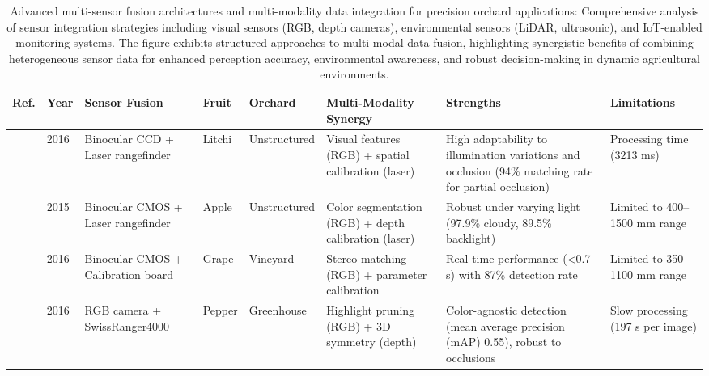 \documentclass{ieeeaccess}
\begin{document}
\iffalse
\begin{table}[ht]
\small
\centering
\caption{Advanced multi-sensor fusion architectures and multi-modality data integration for precision orchard applications: Comprehensive analysis of sensor integration strategies including visual sensors (RGB, depth cameras), environmental sensors (LiDAR, ultrasonic), and IoT-enabled monitoring systems. The figure exhibits structured approaches to multi-modal data fusion, highlighting synergistic benefits of combining heterogeneous sensor data for enhanced perception accuracy, environmental awareness, and robust decision-making in dynamic agricultural environments.} 
\label{tab:dataset}
\begin{tabular}{p{}p{}p{}p{}p{}p{}p{}p{}}
\hline
\textbf{Ref.} & \textbf{Year} & \textbf{Sensor Fusion} & \textbf{Fruit} & \textbf{Orchard} & \textbf{Multi-Modality Synergy} & \textbf{Strengths} & \textbf{Limitations} \\ 
\hline
\cite{wang2016localisation} & 2016 & Binocular CCD + Laser rangefinder & Litchi & Unstructured & Visual features (RGB) + spatial calibration (laser) & High adaptability to illumination variations and occlusion (94\% matching rate for partial occlusion) & Processing time (3213 ms) \\ 
\hline
\cite{si2015location} & 2015 & Binocular CMOS + Laser rangefinder & Apple & Unstructured & Color segmentation (RGB) + depth calibration (laser) & Robust under varying light (97.9\% cloudy, 89.5\% backlight) & Limited to 400–1500 mm range  \\ 
\hline
\cite{luo2016vision} & 2016 & Binocular CMOS + Calibration board & Grape & Vineyard & Stereo matching (RGB) + parameter calibration & Real-time performance (<0.7 s) with 87\% detection rate & Limited to 350–1100 mm range  \\ 
\hline
\cite{barnea2016colour} & 2016 & RGB camera + SwissRanger4000 & Pepper & Greenhouse & Highlight pruning (RGB) + 3D symmetry (depth) & Color-agnostic detection (mean average precision (mAP) 0.55), robust to occlusions & Slow processing (197 s per image)  \\ 

\end{tabular}
\end{table}
\end{document}
